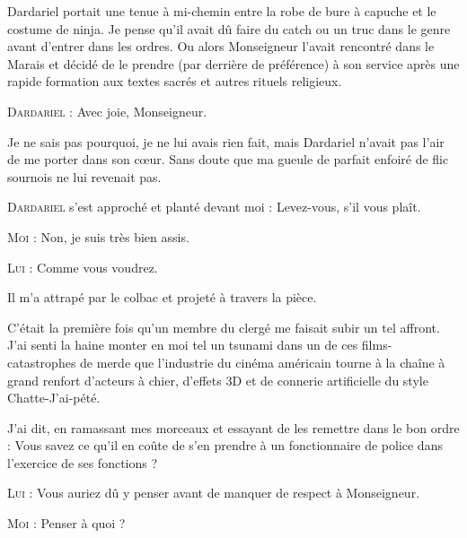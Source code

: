 Dardariel portait une tenue à mi-chemin entre la robe de bure à capuche et le costume de ninja. Je pense qu’il avait dû faire du catch ou un truc dans le genre avant d’entrer dans les ordres. Ou alors Monseigneur l’avait rencontré dans le Marais et décidé de le prendre (par derrière de préférence) à son service après une rapide formation aux textes sacrés et autres rituels religieux.

\begin{dialogue}

\textsc{Dardariel} : Avec joie, Monseigneur.

\end{dialogue}

Je ne sais pas pourquoi, je ne lui avais rien fait, mais Dardariel n’avait pas l’air de me porter dans son cœur. Sans doute que ma gueule de parfait enfoiré de flic sournois ne lui revenait pas.

\begin{dialogue}
  
\textsc{Dardariel} s’est approché et planté devant moi : Levez-vous, s’il vous plaît.

\textsc{Moi} : Non, je suis très bien assis.

\textsc{Lui} : Comme vous voudrez.

\end{dialogue}

Il m’a attrapé par le colbac et projeté à travers la pièce.

C’était la première fois qu’un membre du clergé me faisait subir un tel affront. J’ai senti la haine monter en moi tel un tsunami dans un de ces films-catastrophes de merde que l’industrie du cinéma américain tourne à la chaîne à grand renfort d’acteurs à chier, d’effets 3D et de connerie artificielle du style Chatte-J’ai-pété.

\begin{dialogue}

J’ai dit, en ramassant mes morceaux et essayant de les remettre dans le bon ordre : Vous savez ce qu’il en coûte de s’en prendre à un fonctionnaire de police dans l’exercice de ses fonctions ?

\textsc{Lui} : Vous auriez dû y penser avant de manquer de respect à Monseigneur.

\textsc{Moi} : Penser à quoi ?

\end{dialogue}


